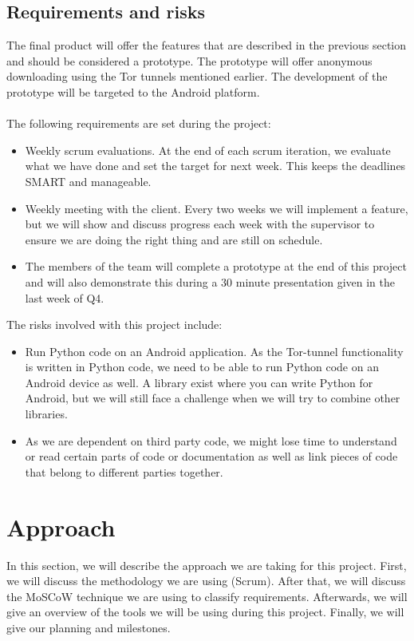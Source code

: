 \subsection{Requirements and risks}
The final product will offer the features that are described in the previous section and should be considered a prototype. The prototype will offer anonymous downloading using the Tor tunnels mentioned earlier. The development of the prototype will be targeted to the Android platform.\\\\
The following requirements are set during the project:

\begin{itemize}
\item Weekly scrum evaluations. At the end of each scrum iteration, we evaluate what we have done and set the target for next week. This keeps the deadlines SMART and manageable.
\item Weekly meeting with the client. Every two weeks we will implement a feature, but we will show and discuss progress each week with the supervisor to ensure we are doing the right thing and are still on schedule.
\item The members of the team will complete a prototype at the end of this project and will also demonstrate this during a 30 minute presentation given in the last week of Q4.
\end{itemize}

The risks involved with this project include:
\begin{itemize}
\item Run Python code on an Android application. As the Tor-tunnel functionality is written in Python code, we need to be able to run Python code on an Android device as well. A library exist where you can write Python for Android, but we will still face a challenge when we will try to combine other libraries.
\item As we are dependent on third party code, we might lose time to understand or read certain parts of code or documentation as well as link pieces of code that belong to different parties together.
\end{itemize}



\section{Approach}
In this section, we will describe the approach we are taking for this project. First, we will discuss the methodology we are using (Scrum). After that, we will discuss the MoSCoW technique we are using to classify requirements. Afterwards, we will give an overview of the tools we will be using during this project. Finally, we will give our planning and milestones.

